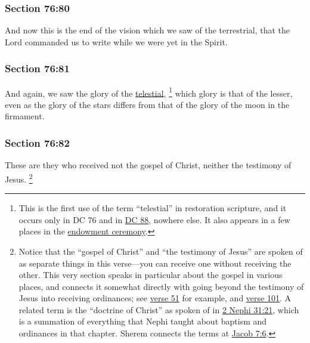 	\subsubsection{Section 76:80} %
		\label{DC76-80}

		And now this is the end of the vision which we saw of the terrestrial, that the Lord commanded us to write while we were yet in the Spirit.


	\subsubsection{Section 76:81} %
		\label{DC76-81}

		And again, we saw the glory of the \hyperref[TELESTIAL]{telestial},%
			\footnote{%
				This is the first use of the term ``telestial'' in restoration scripture, and it occurs only in DC 76 and in \hyperref[DC88]{DC 88}, nowhere else. It also appears in a few places in the \hyperref[TELESTIAL-TEMPLE]{endowment ceremony}.
				}
		which glory is that of the lesser, even as the glory of the stars differs from that of the glory of the moon in the firmament.


	\subsubsection{Section 76:82} %
		\label{DC76-82}

		These are they who received not the gospel of Christ, neither the testimony of Jesus.%
			\footnote{%
				Notice that the ``gospel of Christ'' and ``the testimony of Jesus'' are spoken of as separate things in this verse---you can receive one without receiving the other. This very section speaks in particular about the gospel in various places, and connects it somewhat directly with going beyond the testimony of Jesus into receiving ordinances; see \hyperref[DC76-51]{verse 51} for example, and \hyperref[DC76-101]{verse 101}. A related term is the ``doctrine of Christ'' as spoken of in \hyperref[2NEPHI-31-21]{2 Nephi 31:21}, which is a summation of everything that Nephi taught about baptism and ordinances in that chapter. Sherem connects the terms at \hyperref[JACOB-7-6]{Jacob 7:6}.
				}

